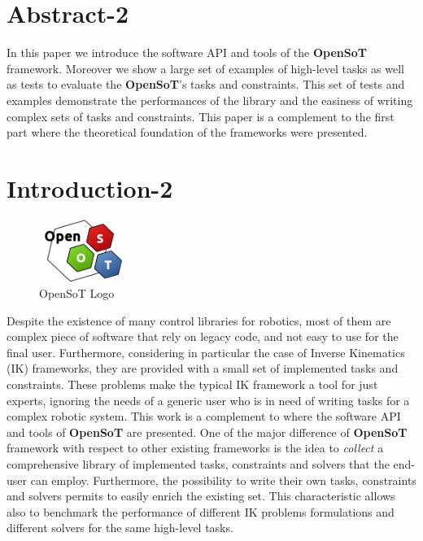 \section{Abstract-2}
\label{sec:abstract2}
In this paper we introduce the software API and tools of the \textbf{OpenSoT} framework. Moreover we show a large set of examples of high-level tasks as well as tests to evaluate the \textbf{OpenSoT}'s tasks and constraints. 
This set of tests and examples demonstrate the performances of the library and the easiness of writing complex sets of tasks and constraints.
This paper is a complement to the first part where the theoretical foundation of the frameworks were presented. 


\section{Introduction-2}
\label{sec:introduction2}
\begin{figure}
  \begin{center}
    \includegraphics[width=0.25\textwidth]{images/openSoT_stickers}
  \end{center}
  \caption{OpenSoT Logo}
\end{figure}
Despite the existence of many control libraries for robotics, most of them are complex piece of software that rely on legacy code, and not easy to use for the final user. Furthermore, considering in particular the case of Inverse Kinematics (IK) frameworks, they are provided with a small set of implemented tasks and constraints. These problems make the typical IK framework a tool for just experts, ignoring the needs of a generic user who is in need of writing tasks for a complex robotic system. This work is a complement to \cite{rocchimingo:16} where the software API and tools of \textbf{OpenSoT} are presented. One of the major difference of \textbf{OpenSoT} framework with respect to other existing frameworks is the idea to \emph{collect} a comprehensive library of implemented tasks, constraints and solvers that the end-user can employ. Furthermore, the possibility to write their own tasks, constraints and solvers permits to easily enrich the existing set. This characteristic allows also to benchmark the performance of different IK problems formulations and different solvers for the same high-level tasks. 

